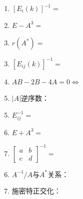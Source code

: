 \documentclass[a4paper,12pt]{article}
\begin{document}
    \vspace{1em}
    \begin{minipage}[t]{0.30\textwidth}
        \begin{enumerate}[leftmargin=0.2em, itemsep=1.1em]
            \item $[E_i(k)]^{-1} =$
            \item $E - A^3 =$
            \item $r(A^*) =$
        \end{enumerate}
    \end{minipage}
    \hfill
    \begin{minipage}[t]{0.30\textwidth}
        \begin{enumerate}[leftmargin=0.2em, itemsep=1.1em]
            \setcounter{enumi}{2}
            \item $[E_{ij}(k)]^{-1} =$
            \item $AB - 2B - 4A = 0 \Leftrightarrow$
            \item $|A|$逆序数：
        \end{enumerate}
    \end{minipage}
    \hfill
    \begin{minipage}[t]{0.30\textwidth}
        \begin{enumerate}[leftmargin=0.2em, itemsep=1.1em]
            \setcounter{enumi}{4}
            \item $E_{ij}^{-1} =$
            \item $E + A^3 =$
            \item $\begin{bmatrix}
                       a & b \\
                       c & d
            \end{bmatrix}^{-1} =$
        \end{enumerate}
    \end{minipage}

    \begin{enumerate}
        \setcounter{enumi}{5}
        \item $A^{-1}/A$与$A^*$关系：
        \item 施密特正交化：
    \end{enumerate}

    \newpage
\end{document}
